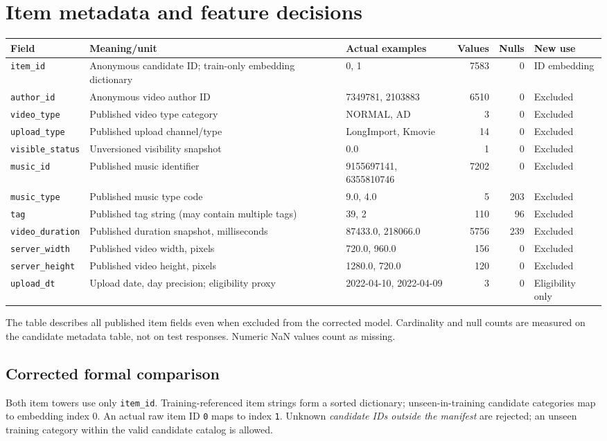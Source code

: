\documentclass[11pt,a4paper]{article}
\begin{document}
\section{Item metadata and feature decisions}
\begingroup\small\setlength{\tabcolsep}{5pt}
\begin{longtable}{p{.16\linewidth}p{.23\linewidth}p{.22\linewidth}rrp{.13\linewidth}}
\toprule Field & Meaning/unit & Actual examples & Values & Nulls & New use\\\midrule\endhead
\texttt{item\_id} & Anonymous candidate ID; train-only embedding dictionary & 0, 1 & 7583 & 0 & ID embedding \\
\texttt{author\_id} & Anonymous video author ID & 7349781, 2103883 & 6510 & 0 & Excluded \\
\texttt{video\_type} & Published video type category & NORMAL, AD & 3 & 0 & Excluded \\
\texttt{upload\_type} & Published upload channel/type & LongImport, Kmovie & 14 & 0 & Excluded \\
\texttt{visible\_status} & Unversioned visibility snapshot & 0.0 & 1 & 0 & Excluded \\
\texttt{music\_id} & Published music identifier & 9155697141, 6355810746 & 7202 & 0 & Excluded \\
\texttt{music\_type} & Published music type code & 9.0, 4.0 & 5 & 203 & Excluded \\
\texttt{tag} & Published tag string (may contain multiple tags) & 39, 2 & 110 & 96 & Excluded \\
\texttt{video\_duration} & Published duration snapshot, milliseconds & 87433.0, 218066.0 & 5756 & 239 & Excluded \\
\texttt{server\_width} & Published video width, pixels & 720.0, 960.0 & 156 & 0 & Excluded \\
\texttt{server\_height} & Published video height, pixels & 1280.0, 720.0 & 120 & 0 & Excluded \\
\texttt{upload\_dt} & Upload date, day precision; eligibility proxy & 2022-04-10, 2022-04-09 & 3 & 0 & Eligibility only \\
\bottomrule\end{longtable}\endgroup
The table describes all published item fields even when excluded from the corrected model. Cardinality and null counts are measured on the candidate metadata table, not on test responses. Numeric NaN values count as missing.

\subsection{Corrected formal comparison}
Both item towers use only \texttt{item\_id}. Training-referenced item strings form a sorted dictionary; unseen-in-training candidate categories map to embedding index 0. An actual raw item ID \texttt{0} maps to index \texttt{1}. Unknown \emph{candidate IDs outside the manifest} are rejected; an unseen training category within the valid candidate catalog is allowed.
\end{document}
